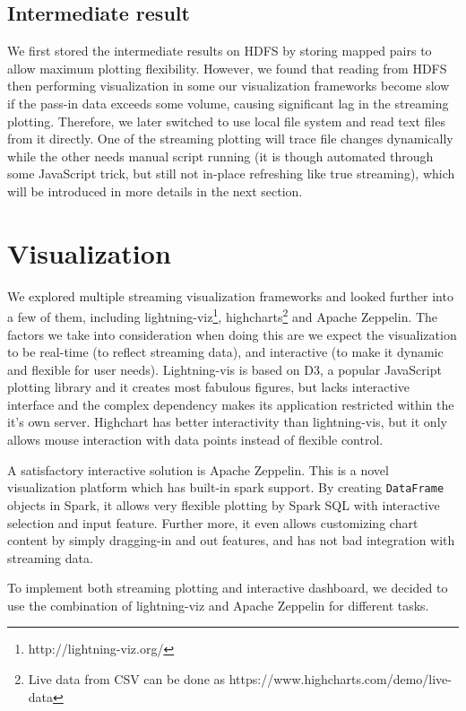 \documentclass[manuscript, review, screen]{acmart}
\begin{document}
\subsection{Intermediate result}
We first stored the intermediate results on HDFS by storing mapped pairs to allow maximum plotting flexibility. However, we found that reading from HDFS then performing visualization in some our visualization frameworks become slow if the pass-in data exceeds some volume, causing significant lag in the streaming plotting. Therefore, we later switched to use local file system and read text files from it directly. One of the streaming plotting will trace file changes dynamically while the other needs manual script running (it is though automated through some JavaScript trick, but still not in-place refreshing like true streaming), which will be introduced in more details in the next section.

\section{Visualization}
We explored multiple streaming visualization frameworks and looked further into a few of them, including lightning-viz\footnote{http://lightning-viz.org/}, highcharts\footnote{Live data from CSV can be done as https://www.highcharts.com/demo/live-data} and Apache Zeppelin. The factors we take into consideration when doing this are we expect the visualization to be real-time (to reflect streaming data), and interactive (to make it dynamic and flexible for user needs). Lightning-vis is based on D3, a popular JavaScript plotting library and it creates most fabulous figures, but lacks interactive interface and the complex dependency makes its application restricted within the it's own server. Highchart has better interactivity than lightning-vis, but it only allows mouse interaction with data points instead of flexible control.

A satisfactory interactive solution is Apache Zeppelin. This is a novel visualization platform which has built-in spark support. By creating \texttt{DataFrame} objects in Spark, it allows very flexible plotting by Spark SQL with interactive selection and input feature. Further more, it even allows customizing chart content by simply dragging-in and out features, and has not bad integration with streaming data.

To implement both streaming plotting and interactive dashboard, we decided to use the combination of lightning-viz and Apache Zeppelin for different tasks.
\end{document}

